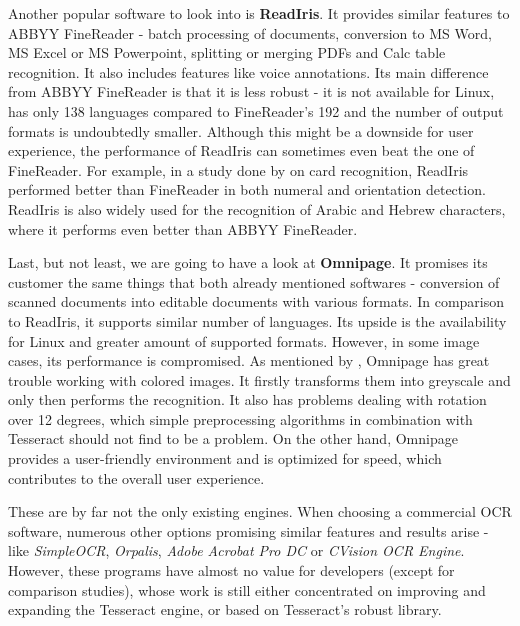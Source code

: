 Another popular software to look into is \textbf{ReadIris}. It provides similar features to ABBYY FineReader - batch processing of documents, conversion to MS Word, MS Excel or MS Powerpoint, splitting or merging PDFs and Calc table recognition. It also includes features like voice annotations. Its main difference from ABBYY FineReader is that it is less robust - it is not available for Linux, has only 138 languages compared to FineReader's 192 and the number of output formats is undoubtedly smaller. Although this might be a downside for user experience, the performance of ReadIris can sometimes even beat the one of FineReader. For example, in a study done by \citet{compABBYYIris} on card recognition, ReadIris performed better than FineReader in both numeral and orientation detection. ReadIris is also widely used for the recognition of Arabic and Hebrew characters, where it performs even better than ABBYY FineReader.

Last, but not least, we are going to have a look at \textbf{Omnipage}. It promises its customer the same things that both already mentioned softwares - conversion of scanned documents into editable documents with various formats. In comparison to ReadIris, it supports similar number of languages. Its upside is the availability for Linux and greater amount of supported formats. However, in some image cases, its performance is compromised. As mentioned by \citet{omnipageTest}, Omnipage has great trouble working with colored images. It firstly transforms them into greyscale and only then performs the recognition. It also has problems dealing with rotation over 12 degrees, which simple preprocessing algorithms in combination with Tesseract should not find to be a problem. On the other hand, Omnipage provides a user-friendly environment and is optimized for speed, which contributes to the overall user experience.

These are by far not the only existing engines. When choosing a commercial OCR software, numerous other options promising similar features and results arise - like \emph{SimpleOCR}, \emph{Orpalis}, \emph{Adobe Acrobat Pro DC} or \emph{CVision OCR Engine}. However, these programs have almost no value for developers (except for comparison studies), whose work is still either concentrated on improving and expanding the Tesseract engine, or based on Tesseract's robust library.
